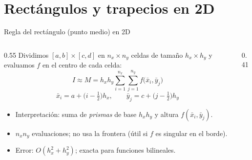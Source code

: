 \documentclass[aspectratio=169,10pt]{beamer}
\begin{document}
\section{Rect\'angulos y trapecios en 2D}
\begin{frame}{Regla del rect\'angulo (punto medio) en 2D}
\begin{columns}[T]
\begin{column}{0.55\textwidth}
\small
Dividimos $[a,b]\times[c,d]$ en $n_x\times n_y$ celdas de tama\~no $h_x\times h_y$ y evaluamos $f$ en el \alert{centro} de cada celda:
\[
I\approx M=h_x h_y\sum_{i=1}^{n_x}\sum_{j=1}^{n_y} f\big(\bar x_i,\bar y_j\big)
\]
\[
\bar x_i=a+\big(i-\tfrac12\big)h_x,\qquad \bar y_j=c+\big(j-\tfrac12\big)h_y
\]
\begin{itemize}
\item Interpretaci\'on: suma de \emph{prismas} de base $h_xh_y$ y altura $f(\bar x_i,\bar y_j)$.
\item $n_xn_y$ evaluaciones; no usa la frontera (\'util si $f$ es singular en el borde).
\item Error: $O(h_x^2+h_y^2)$; exacta para funciones bilineales.
\end{itemize}
\end{column}
\begin{column}{0.41\textwidth}
\centering
{}
\end{column}
\end{columns}
\end{frame}
\end{document}
